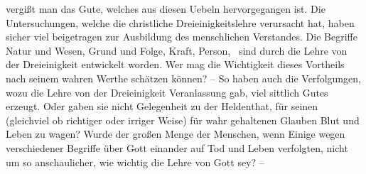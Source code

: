  vergißt man das Gute, welches aus diesen Uebeln hervorgegangen ist. Die Untersuchungen, welche die christliche Dreieinigkeitslehre verursacht hat, haben sicher viel beigetragen zur Ausbildung des menschlichen Verstandes. Die Begriffe Natur und Wesen, Grund und Folge, Kraft, Person, \usw\ sind durch die Lehre von der Dreieinigkeit entwickelt worden. Wer mag die Wichtigkeit dieses Vortheils nach seinem wahren Werthe schätzen können? -- So haben auch die Verfolgungen, wozu die Lehre von der Dreieinigkeit Veranlassung gab, viel sittlich Gutes erzeugt. Oder gaben sie nicht Gelegenheit zu der Heldenthat, für seinen (gleichviel ob richtiger oder irriger Weise) für wahr gehaltenen Glauben Blut und Leben zu wagen? Wurde der großen Menge der Menschen, wenn Einige wegen verschiedener Begriffe über Gott einander auf Tod und Leben verfolgten, nicht um so anschaulicher, wie wichtig die Lehre von Gott sey? --

